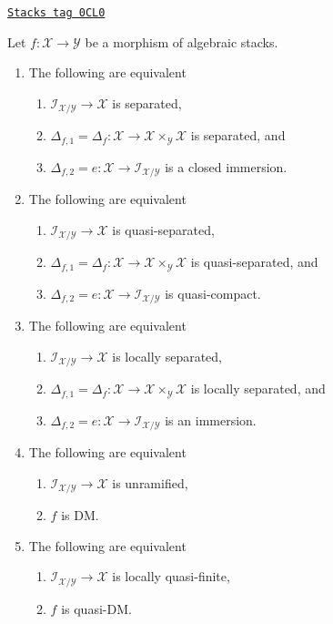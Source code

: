 \begin{lemma}
\label{stacks-morphisms-lemma-diagonal-diagonal}
\href{https://stacks.math.columbia.edu/tag/0CL0}{\texttt{Stacks tag 0CL0}}

Let $f : \mathcal{X} \to \mathcal{Y}$ be a morphism of algebraic stacks.
\begin{enumerate}
\item
The following are equivalent
\begin{enumerate}
\item $\mathcal{I}_{\mathcal{X}/\mathcal{Y}} \to \mathcal{X}$
is separated,
\item $\Delta_{f, 1} = \Delta_f :
\mathcal{X} \to \mathcal{X} \times_\mathcal{Y} \mathcal{X}$
is separated, and
\item $\Delta_{f, 2} = e :
\mathcal{X} \to \mathcal{I}_{\mathcal{X}/\mathcal{Y}}$
is a closed immersion.
\end{enumerate}
\item
The following are equivalent
\begin{enumerate}
\item $\mathcal{I}_{\mathcal{X}/\mathcal{Y}} \to \mathcal{X}$
is quasi-separated,
\item $\Delta_{f, 1} = \Delta_f :
\mathcal{X} \to \mathcal{X} \times_\mathcal{Y} \mathcal{X}$
is quasi-separated, and
\item $\Delta_{f, 2} = e :
\mathcal{X} \to \mathcal{I}_{\mathcal{X}/\mathcal{Y}}$
is quasi-compact.
\end{enumerate}
\item
The following are equivalent
\begin{enumerate}
\item $\mathcal{I}_{\mathcal{X}/\mathcal{Y}} \to \mathcal{X}$
is locally separated,
\item $\Delta_{f, 1} = \Delta_f :
\mathcal{X} \to \mathcal{X} \times_\mathcal{Y} \mathcal{X}$
is locally separated, and
\item $\Delta_{f, 2} = e :
\mathcal{X} \to \mathcal{I}_{\mathcal{X}/\mathcal{Y}}$
is an immersion.
\end{enumerate}
\item
The following are equivalent
\begin{enumerate}
\item $\mathcal{I}_{\mathcal{X}/\mathcal{Y}} \to \mathcal{X}$
is unramified,
\item $f$ is DM.
\end{enumerate}
\item
The following are equivalent
\begin{enumerate}
\item $\mathcal{I}_{\mathcal{X}/\mathcal{Y}} \to \mathcal{X}$
is locally quasi-finite,
\item $f$ is quasi-DM.
\end{enumerate}
\end{enumerate}
\end{lemma}


